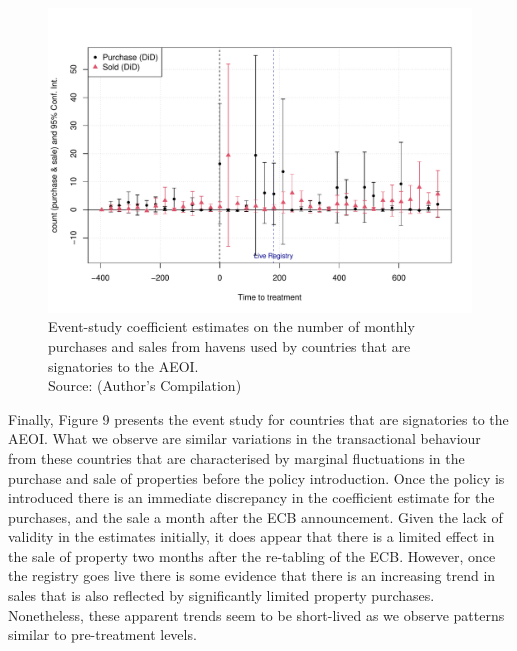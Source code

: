 \documentclass{article}
\begin{document}
\begin{figure}[H]
    \centering
    \includegraphics[width=1\linewidth]{AEOI_purchase.sale.pdf}
    \caption{Event-study coefficient estimates on the number of monthly purchases and sales from havens used by countries that are signatories to the AEOI. \\ Source: (Author's Compilation)}
    \label{fig:enter-label}
\end{figure}

Finally, Figure 9 presents the event study for countries that are signatories to the AEOI. What we observe are similar variations in the transactional behaviour from these countries that are characterised by marginal fluctuations in the purchase and sale of properties before the policy introduction. Once the policy is introduced there is an immediate discrepancy in the coefficient estimate for the purchases, and the sale a month after the ECB announcement. Given the lack of validity in the estimates initially, it does appear that there is a limited effect in the sale of property two months after the re-tabling of the ECB. However, once the registry goes live there is some evidence that there is an increasing trend in sales that is also reflected by significantly limited property purchases. Nonetheless, these apparent trends seem to be short-lived as we observe patterns similar to pre-treatment levels.
\end{document}
